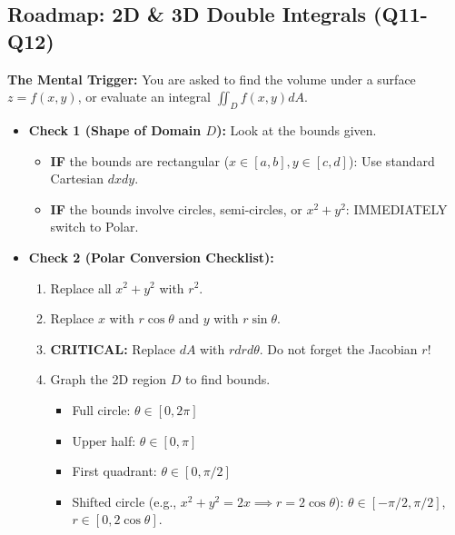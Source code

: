 \documentclass[11pt]{article}
\begin{document}
\subsection{Roadmap: 2D & 3D Double Integrals (Q11-Q12)}
\textbf{The Mental Trigger:} You are asked to find the volume under a surface $z = f(x,y)$, or evaluate an integral $\iint_D f(x,y)dA$.
\begin{itemize}
    \item \textbf{Check 1 (Shape of Domain $D$):} Look at the bounds given.
    \begin{itemize}
        \item \textbf{IF} the bounds are rectangular ($x \in [a,b], y \in [c,d]$): Use standard Cartesian $dx dy$.
        \item \textbf{IF} the bounds involve circles, semi-circles, or $x^2+y^2$: IMMEDIATELY switch to Polar.
    \end{itemize}
    \item \textbf{Check 2 (Polar Conversion Checklist):}
    \begin{enumerate}
        \item Replace all $x^2+y^2$ with $r^2$.
        \item Replace $x$ with $r\cos\theta$ and $y$ with $r\sin\theta$.
        \item \textbf{CRITICAL:} Replace $dA$ with $r dr d\theta$. Do not forget the Jacobian $r$!
        \item Graph the 2D region $D$ to find bounds.
        \begin{itemize}
            \item Full circle: $\theta \in [0, 2\pi]$
            \item Upper half: $\theta \in [0, \pi]$
            \item First quadrant: $\theta \in[0, \pi/2]$
            \item Shifted circle (e.g., $x^2+y^2=2x \implies r=2\cos\theta$): $\theta \in[-\pi/2, \pi/2]$, $r \in [0, 2\cos\theta]$.
        \end{itemize}
    \end{enumerate}
\end{itemize}
\end{document}
